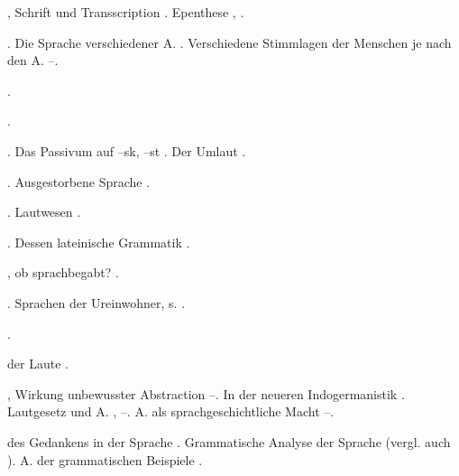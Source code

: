 \begin{register}

, Schrift und Transscription \pageref{sp.134}. Epenthese \pageref{sp.199}, \pageref{sp.401}.


. Die Sprache verschiedener A. \pageref{sp.258}. Verschiedene Stimmlagen der Menschen je nach den A. \pageref{sp.310}–\pageref{sp.311}.




 \pageref{sp.114}.

 \pageref{sp.160}.

. Das Passivum auf –sk, –st \pageref{sp.241}. Der Umlaut \pageref{sp.401}.

 \pageref{sp.114}. Ausgestorbene Sprache \pageref{sp.146}.

. Lautwesen \pageref{sp.34}.

. Dessen lateinische Grammatik \pageref{sp.106}.

, ob sprachbegabt? \pageref{sp.4}.

. Sprachen der Ureinwohner, s. .



 \pageref{sp.215}.

 der Laute \pageref{sp.200}.

, Wirkung unbewusster Abstraction \pageref{sp.63}–\pageref{sp.64}. In der neueren Indogermanistik \pageref{sp.137}. Lautgesetz und A. \pageref{sp.174}, \pageref{sp.186}–\pageref{sp.187}. A. als sprachgeschichtliche Macht \pageref{sp.210}–\pageref{sp.212}\sed{, \pageref{sp.211}}. 

 des Gedankens in der Sprache \sed{\pageref{sp.3},} \pageref{sp.81}. Grammatische Analyse der Sprache \pageref{sp.92} (vergl. auch ). A. der grammatischen Beispiele \pageref{sp.116}.


\end{register}
